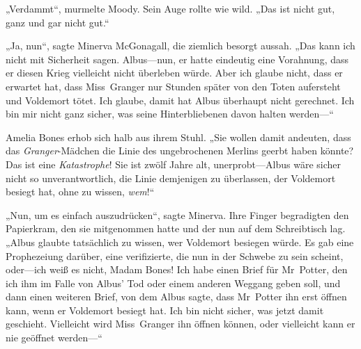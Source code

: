 „Verdammt“, murmelte Moody. Sein Auge rollte wie wild. „Das ist nicht gut, ganz und gar nicht gut.“

„Ja, nun“, sagte Minerva McGonagall, die ziemlich besorgt aussah. „Das kann ich nicht mit Sicherheit sagen. Albus—nun, er hatte eindeutig eine Vorahnung, dass er diesen Krieg vielleicht nicht überleben würde. Aber ich glaube nicht, dass er erwartet hat, dass Miss~Granger nur Stunden später von den Toten aufersteht und Voldemort tötet. Ich glaube, damit hat Albus überhaupt nicht gerechnet. Ich bin mir nicht ganz sicher, was seine Hinterbliebenen davon halten werden—“

Amelia Bones erhob sich halb aus ihrem Stuhl.
„Sie wollen damit andeuten, dass das \emph{Granger}-Mädchen die Linie des ungebrochenen Merlins geerbt haben könnte? Das ist eine \emph{Katastrophe}! Sie ist zwölf Jahre alt, unerprobt—Albus wäre sicher nicht so unverantwortlich, die Linie demjenigen zu überlassen, der Voldemort besiegt hat, ohne zu wissen, \emph{wem}!“

„Nun, um es einfach auszudrücken“, sagte Minerva.
Ihre Finger begradigten den Papierkram, den sie mitgenommen hatte und der nun auf dem Schreibtisch lag. „Albus glaubte tatsächlich zu wissen, wer Voldemort besiegen würde. Es gab eine Prophezeiung darüber, eine verifizierte, die nun in der Schwebe zu sein scheint, oder—ich weiß es nicht, Madam Bones! Ich habe einen Brief für Mr~Potter, den ich ihm im Falle von Albus' Tod oder einem anderen Weggang geben soll, und dann einen weiteren Brief, von dem Albus sagte, dass Mr~Potter ihn erst öffnen kann, wenn er Voldemort besiegt hat. Ich bin nicht sicher, was jetzt damit geschieht.
Vielleicht wird Miss~Granger ihn öffnen können, oder vielleicht kann er nie geöffnet werden—“

